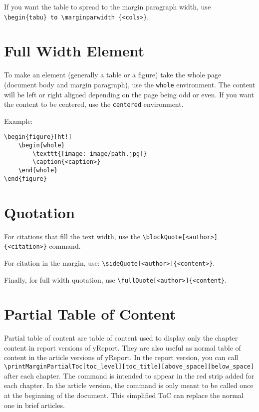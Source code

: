 \documentclass[a4paper, 11pt, oneside, fleqn]{article}
\begin{document}
	If you want the table to spread to the margin paragraph width, use \lstinline[breaklines]|\begin{tabu} to \marginparwidth {<cols>}|.
	
	\section{Full Width Element}
	To make an element (generally a table or a figure) take the whole page (document body and margin paragraph), use the \lstinline[breaklines]|whole| environment. The content will be left or right aligned depending on the page being odd or even. If you want the content to be centered, use the \lstinline[breaklines]|centered| environment.
	
	Example:
	\begin{lstlisting}
\begin{figure}[ht!]
	\begin{whole}
		\texttt{[image: image/path.jpg]}
		\caption{<caption>}
	\end{whole}
\end{figure}
	\end{lstlisting}

	\section{Quotation}
	For citations that fill the text width, use the \lstinline|\blockQuote[<author>]{<citation>}| command.
	
	For citation in the margin, use: \lstinline|\sideQuote[<author>]{<content>}|.
	
	Finally, for full width quotation, use \lstinline|\fullQuote[<author>]{<content}|.
	
	\section{Partial Table of Content}
	Partial table of content are table of content used to display only the chapter content in report versions of yReport. They are also useful as normal table of content in the article versions of yReport. In the report version, you can call \lstinline[breaklines]|\printMarginPartialToc[toc_level][toc_title][above_space][below_space]| after each chapter. The command is intended to appear in the red strip added for each chapter. In the article version, the command is only meant to be called once at the beginning of the document. This simplified ToC can replace the normal one in brief articles.
	
\end{document}
